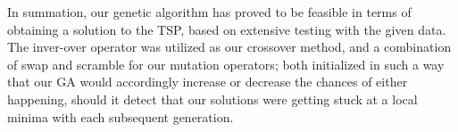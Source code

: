 In summation, our genetic algorithm has proved to be feasible 
in terms of obtaining a solution to the TSP, based on extensive 
testing with the given data. The inver-over operator was utilized 
as our crossover method, and a combination of swap and scramble 
for our mutation operators; both initialized in such a way that 
our GA would accordingly increase or decrease the chances of 
either happening, should it detect that our solutions were 
getting stuck at a local minima with each subsequent generation.
